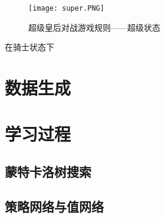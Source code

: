 \begin{figure}[htb]
    \centering
    \texttt{[image: super.PNG]}
    \caption[rules_super]{%
        超级皇后对战游戏规则——超级状态%
      }
    \label{fig:super}
\end{figure}
在骑士状态下

\section{数据生成}

\section{学习过程}

\subsection{蒙特卡洛树搜索}

\subsection{策略网络与值网络}